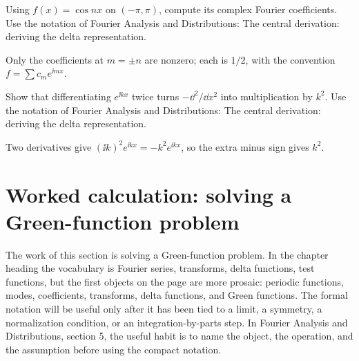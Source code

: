 \begin{exercise}
Using \(f(x)=\cos nx\) on \((-\pi,\pi)\), compute its complex Fourier coefficients.  Use the notation of Fourier Analysis and Distributions: The central derivation: deriving the delta representation.
\begin{answer}
Only the coefficients at \(m=\pm n\) are nonzero; each is \(1/2\), with the convention \(f=\sum c_me^{\ii mx}\).
\end{answer}
\end{exercise}

\begin{exercise}
Show that differentiating \(e^{\ii kx}\) twice turns \(-\dd^2/\dd x^2\) into multiplication by \(k^2\).  Use the notation of Fourier Analysis and Distributions: The central derivation: deriving the delta representation.
\begin{answer}
Two derivatives give \((\ii k)^2e^{\ii kx}=-k^2e^{\ii kx}\), so the extra minus sign gives \(k^2\).
\end{answer}
\end{exercise}



\section{Worked calculation: solving a Green-function problem}













The work of this section is solving a Green-function problem.  In the chapter heading the vocabulary is Fourier series, transforms, delta functions, test functions, but the first objects on the page are more prosaic: periodic functions, modes, coefficients, transforms, delta functions, and Green functions.  The formal notation will be useful only after it has been tied to a limit, a symmetry, a normalization condition, or an integration-by-parts step.  In Fourier Analysis and Distributions, section 5, the useful habit is to name the object, the operation, and the assumption before using the compact notation.

